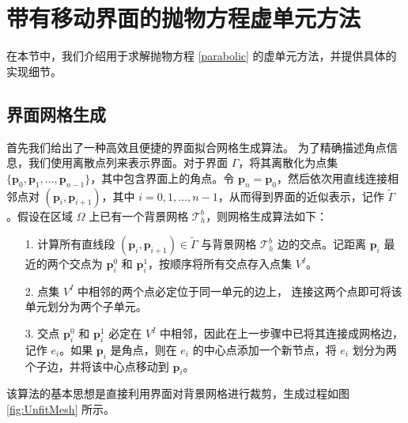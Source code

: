 \section{带有移动界面的抛物方程虚单元方法}
\label{vemformulation}
在本节中，我们介绍用于求解抛物方程 \eqref{parabolic} 的虚单元方法，并提供具体的实现细节。

\subsection{界面网格生成}
\label{meshgeneration}
首先我们给出了一种高效且便捷的界面拟合网格生成算法。
为了精确描述角点信息，我们使用离散点列来表示界面。对于界面
$\Gamma$，将其离散化为点集 $\{\boldsymbol{p}_0, \boldsymbol{p}_1, \dots,
\boldsymbol{p}_{n-1}\}$，其中包含界面上的角点。令 $\boldsymbol{p}_n =
\boldsymbol{p}_0$，然后依次用直线连接相邻点对 $(\boldsymbol{p}_i,
\boldsymbol{p}_{i+1})$，其中 $i = 0, 1, \dots,
n-1$，从而得到界面的近似表示，记作 $\tilde{\Gamma}$。假设在区域 $\Omega$
上已有一个背景网格 $\mathcal{T}_h^b$，则网格生成算法如下：

\begin{itemize}
    \item[1.] 计算所有直线段 $(\boldsymbol{p}_i, \boldsymbol{p}_{i+1}) \in
        \tilde{\Gamma}$ 与背景网格 $\mathcal{T}_h^b$ 边的交点。记距离
        $\boldsymbol{p}_i$ 最近的两个交点为 $\boldsymbol{p}^0_i$ 和
        $\boldsymbol{p}^1_i$，按顺序将所有交点存入点集 $V^I$。
    \item[2.] 点集 $V^I$ 中相邻的两个点必定位于同一单元的边上，
        连接这两个点即可将该单元划分为两个子单元。
    \item[3.] 交点 $\boldsymbol{p}^0_i$ 和 $\boldsymbol{p}^1_i$
        必定在 $V^I$ 中相邻，因此在上一步骤中已将其连接成网格边，
        记作 $e_i$。如果
        $\boldsymbol{p}_i$ 是角点，则在 $e_i$ 的中心点添加一个新节点，将 $e_i$
        划分为两个子边，并将该中心点移动到 $\boldsymbol{p}_i$。
\end{itemize}
该算法的基本思想是直接利用界面对背景网格进行裁剪，生成过程如图
\ref{fig:UnfitMesh} 所示。

